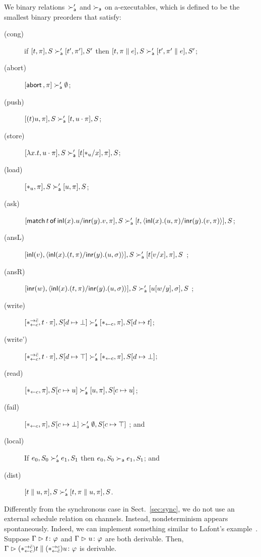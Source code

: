 \documentclass[envcountsame]{llncs}
\begin{document}
We binary relations~$\succ_{\mathsf a}'$ and $\succ_{\mathsf a}$ on a-executables,
which is defined to be the smallest binary preorders
that satisfy:
\begin{description}
 \item[(cong)] if
	    $[t,\pi],         S \succ_{\mathsf a}' [ t',\pi'],        S'$
	    then
	    $[t,\pi \parallel e], S \succ_{\mathsf a}' [ t',\pi'\parallel e], S'$\enspace;
 \item[(abort)] $[\mathsf{abort\,},\pi] \succ_{\mathsf a}' \emptyset$\enspace;
 \item[(push)]
	    $[(t)u,\pi],S       \succ_{\mathsf a}' [t,u\cdot\pi],S$;
 \item[(store)]
	    $[\lambda x.t,u\cdot\pi],S
	     \succ_{\mathsf a}'
	     [t[\ast_u/x],      \pi],S$\enspace;
 \item[(load)]
	    $[\ast_u,\pi],S\succ_{\mathsf a}'[u,\pi],S$\enspace;
 \item[(ask)]
      $[\mathsf{match}\,{t}\,\mathsf{of}\, \mathsf{inl}({x}). {u}/ \mathsf{inr}({y}). {v},\pi], S\succ_{\mathsf a}' [t,\langle \mathsf{inl}({x}). ({u},{\pi})/ \mathsf{inr}({y}). ({v},{\pi})\rangle], S$\enspace;
 \item[(ansL)]
      $[\mathsf{inl}({v}), \langle \mathsf{inl}({x}). ({t},{\pi})/ \mathsf{inr}({y}). ({u},{\sigma})\rangle],S \succ_{\mathsf a}' [t[v/x],\pi],S $ \enspace;
 \item[(ansR)]
      $[\mathsf{inr}({w}), \langle \mathsf{inl}({x}). ({t},{\pi})/ \mathsf{inr}({y}). ({u},{\sigma})\rangle],S \succ_{\mathsf a}' [u[w/y],\sigma],S $ \enspace;
 \item[(write)]
	    $
	    [\ast^{\rightarrow {\bar{c}}}_{\leftarrow{c}}, t\cdot\pi], S[d\mapsto\bot]
	    \succ_{\mathsf a}'
	    [\ast_{\leftarrow{c}}, \pi],
	    S[d\mapsto t]
	    $\enspace;
 \item[(write')]
	    $
	    [\ast^{\rightarrow {\bar{c}}}_{\leftarrow{c}}, t\cdot\pi], S[d\mapsto \top]
	    \succ_{\mathsf a}'
	    [\ast_{\leftarrow{c}}, \pi],
	    S[d\mapsto \bot]
	    $\enspace;
 \item[(read)]$
	    [\ast_{\leftarrow{c}} ,\pi],
	    S[c\mapsto u]
	    \succ_{\mathsf a}'
	    [u,\pi],
	    S[c\mapsto u]
	    $\enspace;
 \item[(fail)]
	    $
	    [\ast_{\leftarrow{c}},\pi],
	    S[c\mapsto \bot]
	    \succ_{\mathsf a}'
	    \emptyset,S[c\mapsto \top]
	    $
	    \enspace; and
 \item[(local)] If $e_0, S_0\succ_{\mathsf a}'e_1, S_1$ then $e_0, S_0\succ_{\mathsf a} e_1,
      S_1$\enspace; and
 \item[(dist)]
	    $[t\parallel u,\pi],S   \succ_{\mathsf a}' [t,\pi\parallel u,\pi],S$\enspace.
\end{description}
Differently from the synchronous case in Sect.~\ref{sec:sync},
we do not use an external schedule relation on channels.
Instead, nondeterminism appears spontaneously.
Indeed, we can implement something similar to Lafont's
example~\citep[B.1]{girard1989proofs}.
Suppose $\Gamma\vartriangleright{t} \colon{\varphi}$ and $\Gamma\vartriangleright{u} \colon{\varphi}$ are both derivable.
Then,
$\Gamma\vartriangleright{(\ast^{\rightarrow {\bar{c}}}_{\leftarrow{c}})t\parallel(\ast^{\rightarrow {c}}_{\leftarrow{\bar{c}}})u} \colon{\varphi}$ is derivable.
\end{document}

